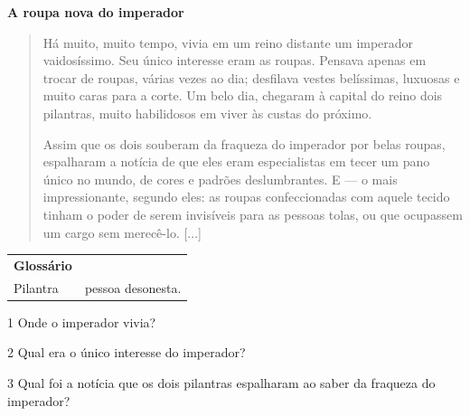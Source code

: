 \textbf{A roupa nova do imperador}



\begin{quote}
Há muito, muito tempo, vivia em um reino distante um imperador
vaidosíssimo. Seu único interesse eram as roupas. Pensava apenas em
trocar de roupas, várias vezes ao dia; desfilava vestes belíssimas,
luxuosas e muito caras para a corte. Um belo dia, chegaram à capital do
reino dois pilantras, muito habilidosos em viver às custas do próximo.

Assim que os dois souberam da fraqueza do imperador por belas roupas,
espalharam a notícia de que eles eram especialistas em tecer um pano
único no mundo, de cores e padrões deslumbrantes. E --- o mais
impressionante, segundo eles: as roupas confeccionadas com aquele tecido
tinham o poder de serem invisíveis para as pessoas tolas, ou que
ocupassem um cargo sem merecê-lo. {[}...{]}
\end{quote}


\begin{tabular}{ll}
\textbf{Glossário} & \mbox{}\\
Pilantra & pessoa desonesta.\\
\end{tabular}

\num{1} Onde o imperador vivia?


\num{2} Qual era o único interesse do imperador?


\num{3} Qual foi a notícia que os dois pilantras espalharam ao saber da fraqueza
do imperador?



